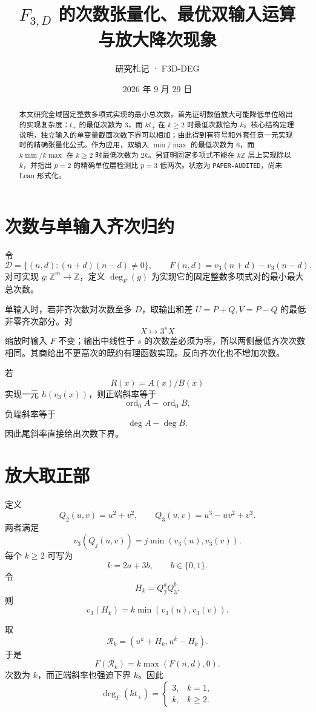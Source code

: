 \documentclass[11pt,a4paper]{ctexart}
\title{\bfseries \(F_{3,D}\) 的次数张量化、最优双输入运算\\与放大降次现象}
\author{研究札记 · F3D-DEG}
\date{2026 年 9 月 29 日}
\begin{document}
\maketitle
\begin{abstract}
本文研究全域固定整数多项式实现的最小总次数。首先证明数值放大可能降低单位输出的实现复杂度：\(t_+\) 的最低次数为 \(3\)，而 \(k t_+\) 在 \(k\ge2\) 时最低次数恰为 \(k\)。核心结构定理说明，独立输入的单变量截面次数下界可以相加；由此得到有符号和外套任意一元实现时的精确张量化公式。作为应用，双输入 \(\min/\max\) 的最低次数为 \(6\)，而 \(k\min/k\max\) 在 \(k\ge2\) 时最低次数为 \(2k\)。另证明固定多项式不能在 \(k\mathbb Z\) 层上实现除以 \(k\)，并指出 \(p=2\) 的精确单位层检测比 \(p=3\) 低两次。状态为 \texttt{PAPER-AUDITED}，尚未 Lean 形式化。
\end{abstract}

\section{次数与单输入齐次归约}
令
\[
\mathcal D=\{(n,d):(n+d)(n-d)\ne0\},
\qquad
F(n,d)=v_3(n+d)-v_3(n-d).
\]
对可实现 \(g:\mathbb Z^m\to\mathbb Z\)，定义 \(\deg_F(g)\) 为实现它的固定整数多项式对的最小最大总次数。

单输入时，若非齐次数对次数至多 \(D\)，取输出和差 \(U=P+Q,V=P-Q\) 的最低非零齐次部分。对
\[
X\mapsto3^sX
\]
缩放时输入 \(F\) 不变；输出中线性于 \(s\) 的次数差必须为零，所以两侧最低齐次次数相同。其商给出不更高次的既约有理函数实现。反向齐次化也不增加次数。

若
\[
R(x)=A(x)/B(x)
\]
实现一元 \(h(v_3(x))\)，则正端斜率等于
\[
\operatorname{ord}_0A-\operatorname{ord}_0B,
\]
负端斜率等于
\[
\deg A-\deg B.
\]
因此尾斜率直接给出次数下界。

\section{放大取正部}
定义
\[
Q_2(u,v)=u^2+v^2,
\qquad
Q_3(u,v)=u^3-uv^2+v^3.
\]
两者满足
\[
v_3(Q_j(u,v))
=
j\min(v_3(u),v_3(v)).
\]
每个 \(k\ge2\) 可写为
\[
k=2a+3b,\qquad b\in\{0,1\}.
\]
令
\[
H_k=Q_2^aQ_3^b.
\]
则
\[
v_3(H_k)=k\min(v_3(u),v_3(v)).
\]

取
\[
\mathcal R_k=
(u^k+H_k,u^k-H_k).
\]
于是
\[
\boxed{
F(\mathcal R_k)=k\max(F(n,d),0).
}
\]
次数为 \(k\)，而正端斜率也强迫下界 \(k\)。因此
\[
\boxed{
\deg_F(k t_+)
=
\begin{cases}
3,&k=1,\\
k,&k\ge2.
\end{cases}
}
\]
\end{document}
